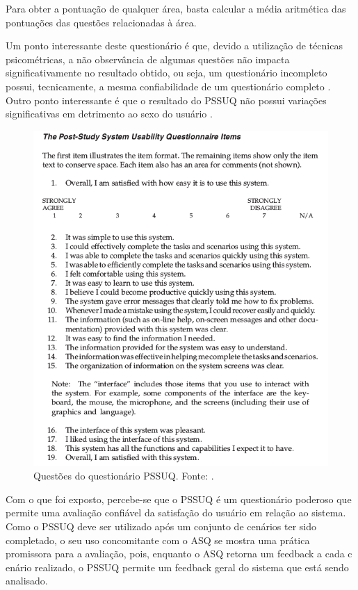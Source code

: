       Para obter a pontuação de qualquer área, basta calcular a média aritmética das pontuações das questões relacionadas à área.
      
      
      Um ponto interessante deste questionário é que, devido a utilização de técnicas psicométricas, a não observância de
      algumas questões não impacta significativamente no resultado obtido, ou seja, um questionário incompleto possui, 
      tecnicamente, a mesma confiabilidade de um questionário completo \cite{lewis02}. Outro ponto interessante é que o
      resultado do PSSUQ não possui variações significativas em detrimento ao sexo do usuário \cite{lewis02}.
      
      \begin{figure}[!htpb]
	\centering
	\includegraphics[scale=0.7]{editaveis/figuras/pssuq_questions}
	\caption[Questões do questionário PSSUQ]{Questões do questionário PSSUQ. Fonte: \cite{lewis02}.}
	\label{pssuq_questions}
      \end{figure}
      
      Com o que foi exposto, percebe-se que o PSSUQ é um questionário poderoso que permite uma avaliação confiável da
      satisfação do usuário em relação ao sistema. Como o PSSUQ deve ser utilizado após um conjunto de cenários ter sido
      completado, o seu uso concomitante com o ASQ se mostra uma prática promissora para a avaliação, pois, enquanto o ASQ
      retorna um feedback a cada c
      enário realizado, o PSSUQ permite um feedback geral do sistema que está sendo analisado.
    

